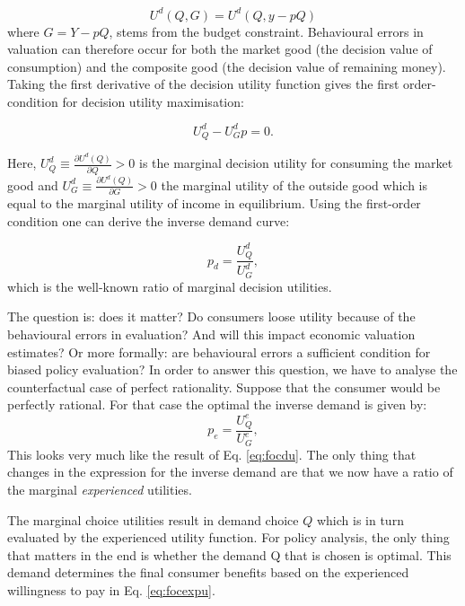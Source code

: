 \documentclass[
]{book}
\begin{document}
\begin{equation}
U^d (Q,G)= U^d (Q, y - pQ)
\end{equation}
where \(G=Y-pQ\), stems from the budget constraint. Behavioural errors in valuation can therefore occur for both the market good (the decision value of consumption) and the composite good (the decision value of remaining money). Taking the first derivative of the decision utility function gives the first order-condition for decision utility maximisation:

\begin{equation}
U^d_Q - U^d_G p = 0.
\end{equation}

Here, \(U_Q^d \equiv \frac{\partial U^d (Q)}{\partial Q}>0\) is the marginal decision utility for consuming the market good and \(U_G^d \equiv \frac{\partial U^d (Q)}{\partial G}>0\) the marginal utility of the outside good which is equal to the marginal utility of income in equilibrium. Using the first-order condition one can derive the inverse demand curve:

\begin{equation}
p_d = \frac{U_Q^d}{U_G^d},
\label{eq:focdu}
\end{equation}
which is the well-known ratio of marginal decision utilities.

The question is: does it matter? Do consumers loose utility because of the behavioural errors in evaluation? And will this impact economic valuation estimates? Or more formally: are behavioural errors a sufficient condition for biased policy evaluation? In order to answer this question, we have to analyse the counterfactual case of perfect rationality. Suppose that the consumer would be perfectly rational. For that case the optimal the inverse demand is given by:
\begin{equation}
p_e = \frac{U_Q^e}{U_G^e},
\label{eq:focexpu}
\end{equation}
This looks very much like the result of Eq. \eqref{eq:focdu}. The only thing that changes in the expression for the inverse demand are that we now have a ratio of the marginal \emph{experienced} utilities.

The marginal choice utilities result in demand choice \(Q\) which is in turn evaluated by the experienced utility function. For policy analysis, the only thing that matters in the end is whether the demand Q that is chosen is optimal. This demand determines the final consumer benefits based on the experienced willingness to pay in Eq. \eqref{eq:focexpu}.
\end{document}
